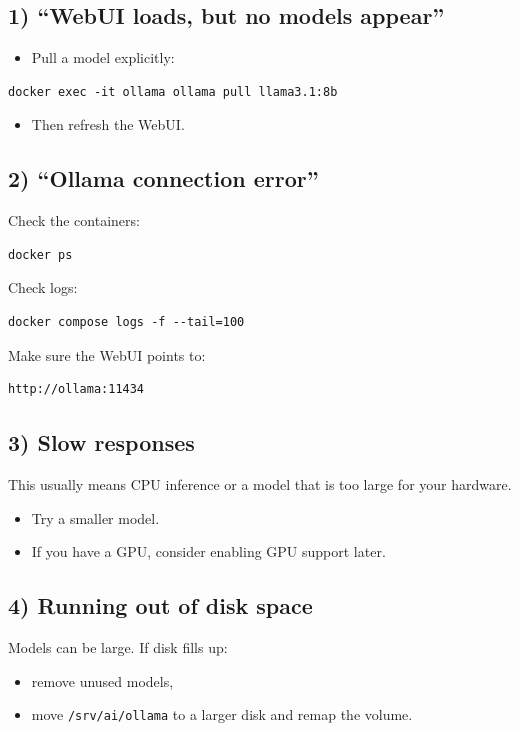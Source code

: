 \subsection{1) ``WebUI loads, but no models appear''}
\begin{itemize}[leftmargin=*]
  \item Pull a model explicitly:
\end{itemize}
\begin{lstlisting}
docker exec -it ollama ollama pull llama3.1:8b
\end{lstlisting}
\begin{itemize}[leftmargin=*]
  \item Then refresh the WebUI.
\end{itemize}

\subsection{2) ``Ollama connection error''}
Check the containers:
\begin{lstlisting}
docker ps
\end{lstlisting}
Check logs:
\begin{lstlisting}
docker compose logs -f --tail=100
\end{lstlisting}
Make sure the WebUI points to:
\begin{lstlisting}
http://ollama:11434
\end{lstlisting}

\subsection{3) Slow responses}
This usually means CPU inference or a model that is too large for your hardware.
\begin{itemize}[leftmargin=*]
  \item Try a smaller model.
  \item If you have a GPU, consider enabling GPU support later.
\end{itemize}

\subsection{4) Running out of disk space}
Models can be large. If disk fills up:
\begin{itemize}[leftmargin=*]
  \item remove unused models,
  \item move \texttt{/srv/ai/ollama} to a larger disk and remap the volume.
\end{itemize}

